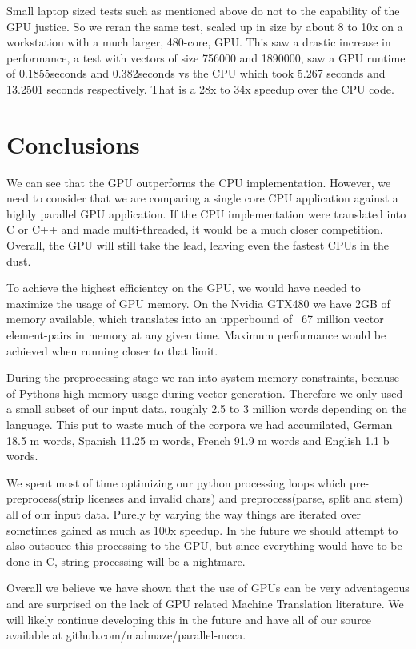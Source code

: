 \documentclass[12pt]{article}
\begin{document}
Small laptop sized tests such as mentioned above do not to the capability of the GPU justice. So we reran the same test, scaled up in size by about 8 to 10x on a workstation with a much larger, 480-core, GPU. This saw a drastic increase in performance, a test with vectors of size 756000 and 1890000, saw a GPU runtime of 0.1855seconds and 0.382seconds vs the CPU which took 5.267 seconds and 13.2501 seconds respectively. That is a 28x to 34x speedup over the CPU code.

\section{Conclusions}
We can see that the GPU outperforms the CPU implementation. However, we need to consider that we are comparing a single core CPU application against a highly parallel GPU application. If the CPU implementation were translated into C or C++ and made multi-threaded, it would be a much closer competition. Overall, the GPU will still take the lead, leaving even the fastest CPUs in the dust.

To achieve the highest efficientcy on the GPU, we would have needed to maximize the usage of GPU memory. On the Nvidia GTX480 we have 2GB of memory available, which translates into an upperbound of ~67 million vector element-pairs in memory at any given time. Maximum performance would be achieved when running closer to that limit. 

During the preprocessing stage we ran into system memory constraints, because of Pythons high memory usage during vector generation. Therefore we only used a small subset of our input data, roughly 2.5 to 3 million words depending on the language. This put to waste much of the corpora we had accumilated, German 18.5 m words, Spanish 11.25 m words, French 91.9 m words and English 1.1 b words.

We spent most of time optimizing our python processing loops which pre-preprocess(strip licenses and invalid chars) and preprocess(parse, split and stem) all of our input data. Purely by varying the way things are iterated over sometimes gained as much as 100x speedup. In the future we should attempt to also outsouce this processing to the GPU, but since everything would have to be done in C, string processing will be a nightmare. 

Overall we believe we have shown that the use of GPUs can be very adventageous and are surprised on the lack of GPU related Machine Translation literature. We will likely continue developing this in the future and have all of our source available at github.com/madmaze/parallel-mcca.



\end{document}
